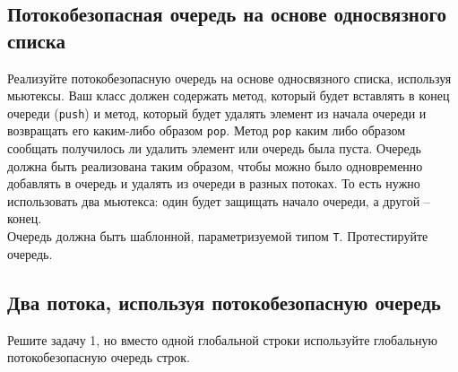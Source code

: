 \documentclass{article}
\begin{document}
\subsection{Потокобезопасная очередь на основе односвязного списка}
Реализуйте потокобезопасную очередь на основе односвязного списка, используя мьютексы.
Ваш класс должен содержать метод, который будет вставлять в конец очереди (\texttt{push}) и метод, который будет удалять элемент из начала очереди и возвращать его каким-либо образом \texttt{pop}. Метод \texttt{pop} каким либо образом сообщать получилось ли удалить элемент или очередь была пуста.
Очередь должна быть реализована таким образом, чтобы можно было одновременно добавлять в очередь и удалять из очереди в разных потоках. То есть нужно использовать два мьютекса: один будет защищать начало очереди, а другой -- конец.\\
Очередь должна быть шаблонной, параметризуемой типом \texttt{T}. Протестируйте очередь.


\subsection{Два потока, используя потокобезопасную очередь}
Решите задачу 1, но вместо одной глобальной строки используйте глобальную потокобезопасную очередь строк.
\end{document}
